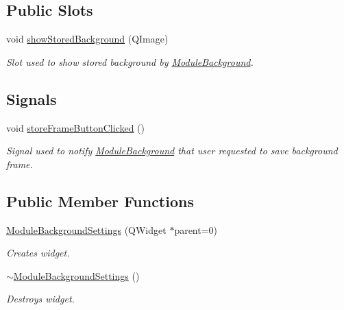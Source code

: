 \subsection*{Public Slots}
\begin{DoxyCompactItemize}
\item 
void \hyperlink{class_module_background_settings_af9d9c8a40a2e6b3afc5f5a2536873273}{showStoredBackground} (QImage)
\begin{DoxyCompactList}\small\item\em Slot used to show stored background by \hyperlink{class_module_background}{ModuleBackground}. \item\end{DoxyCompactList}\end{DoxyCompactItemize}
\subsection*{Signals}
\begin{DoxyCompactItemize}
\item 
\hypertarget{class_module_background_settings_aeba98bee4a76ee1007ff3e48a6079e19}{
void \hyperlink{class_module_background_settings_aeba98bee4a76ee1007ff3e48a6079e19}{storeFrameButtonClicked} ()}
\label{d7/deb/class_module_background_settings_aeba98bee4a76ee1007ff3e48a6079e19}

\begin{DoxyCompactList}\small\item\em Signal used to notify \hyperlink{class_module_background}{ModuleBackground} that user requested to save background frame. \item\end{DoxyCompactList}\end{DoxyCompactItemize}
\subsection*{Public Member Functions}
\begin{DoxyCompactItemize}
\item 
\hyperlink{class_module_background_settings_a4d10af27767dd4f64260550b4c9ec4d3}{ModuleBackgroundSettings} (QWidget $\ast$parent=0)
\begin{DoxyCompactList}\small\item\em Creates widget. \item\end{DoxyCompactList}\item 
\hypertarget{class_module_background_settings_af80d0ae8ae60b6904c1fa4882a171f6a}{
\hyperlink{class_module_background_settings_af80d0ae8ae60b6904c1fa4882a171f6a}{$\sim$ModuleBackgroundSettings} ()}
\label{d7/deb/class_module_background_settings_af80d0ae8ae60b6904c1fa4882a171f6a}

\begin{DoxyCompactList}\small\item\em Destroys widget. \item\end{DoxyCompactList}\end{DoxyCompactItemize}


